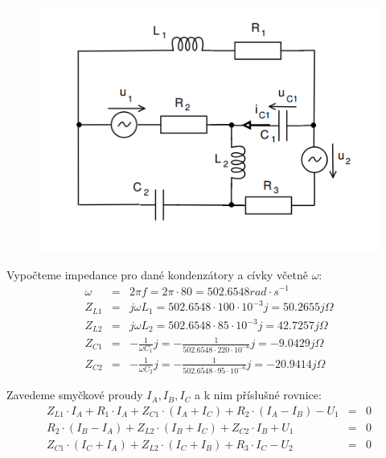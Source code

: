 \documentclass[a4paper,oneside,13pt]{article}
\begin{document}
	\begin{figure}[h]
		\begin{center}
			\includegraphics[width=12cm,keepaspectratio]{RLC_4.PNG}
		\end{center}
	\end{figure}

	Vypočteme impedance pro dané kondenzátory a cívky včetně $\omega$:
	\begin{eqnarray*}
		\omega & = & 2\pi f = 2\pi \cdot 80 = 502.6548 rad\cdot s^{-1} \\
		Z_{L1} & = & j \omega L_{1} = 502.6548  \cdot  100 \cdot 10^{-3} j = 50.2655 j \Omega \\
		Z_{L2} & = & j \omega L_{2} = 502.6548  \cdot  85 \cdot 10^{-3} j = 42.7257 j \Omega \\
		Z_{C1} & = & - \frac{1}{\omega C_{1}}j = - \frac{1}{502.6548 \cdot 220 \cdot 10^{-6}}j = -9.0429 j \Omega \\
		Z_{C2} & = & - \frac{1}{\omega C_{2}}j = - \frac{1}{502.6548  \cdot 95 \cdot 10^{-6}}j = -20.9414 j \Omega 
	\end{eqnarray*}

	Zavedeme smyčkové proudy $I_{A}, I_{B}, I_{C}$ a k nim příslušné rovnice:
	\begin{eqnarray*}
		Z_{L1} \cdot I_{A} + R_{1} \cdot I_{A} + Z_{C1} \cdot (I_{A} + I_{C}) + R_{2} \cdot (I_{A} - I_{B}) - U_{1} & = & 0 \\
		R_{2} \cdot (I_{B} - I_{A}) + Z_{L2} \cdot (I_{B} + I_{C}) + Z_{C2} \cdot I_{B} + U_{1} & = & 0 \\
		Z_{C1} \cdot (I_{C} + I_{A}) + Z_{L2} \cdot (I_{C} + I_{B}) + R_{3}  \cdot I_{C} - U_{2} & = & 0 \\
	\end{eqnarray*}
\end{document}
